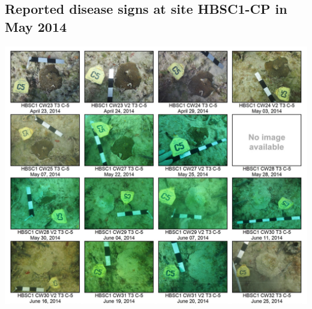 \begin{subappendices}
	\section{Reported disease signs at site HBSC1-CP in May 2014}\label{onset:appendice}
	\includegraphics[width=\textwidth]{chapters/onset/figures/hbsc1_cp.png}
\end{subappendices}